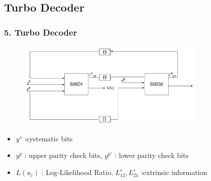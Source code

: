 \documentclass{beamer}  %
\begin{document}
\subsection{Turbo Decoder}
\begin{frame}
\frametitle{5. Turbo Decoder}

\begin{figure}
\centering
		\includegraphics[width=9cm]{TurboDecoder.pdf}
	\end{figure}
\begin{itemize}
\item $y^s$ :systematic bits

\item $y^p$ : upper parity check bits,  $y^{p'}$ : lower parity check bits


\item $L(u_i)$ : Log-Likelihood Ratio, $L^e_{12}, L^e_{21}$ :extrinsic information

\end{itemize}

\end{frame}

\end{document}
